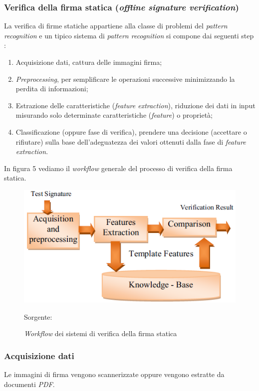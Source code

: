 \subsubsection{Verifica della firma statica (\emph{offline signature verification})}
\label{2.1.3}
La verifica di firme statiche appartiene alla classe di problemi del \emph{pattern recognition} e un tipico sistema di \emph{pattern recognition} si compone dai seguenti step \cite{2698894}:
\begin{enumerate}
\item Acquisizione dati, cattura delle immagini firma;
\item \emph{Preprocessing}, per semplificare le operazioni successive minimizzando la perdita di informazioni;
\item Estrazione delle caratteristiche (\emph{feature extraction}), riduzione dei dati in input misurando solo determinate caratteristiche (\emph{feature}) o proprietà;
\item Classificazione (oppure fase di verifica), prendere una decisione (accettare o rifiutare) sulla base dell'adeguatezza dei valori ottenuti dalla fase di \emph{feature extraction}.
\end{enumerate}
In figura 5 vediamo il \emph{workflow} generale del processo di verifica della firma statica.
\begin{figure}[H]
\centering
\includegraphics[scale=0.8]{../Logo&Header/generalProcess.png}
\caption{\emph{Workflow} dei sistemi di verifica della firma statica} Sorgente: \cite{4}
\end{figure}
\subsubsection*{Acquisizione dati}
\label{2.1.3.1}
Le immagini di firma vengono scannerizzate oppure vengono estratte da documenti \emph{PDF}.
